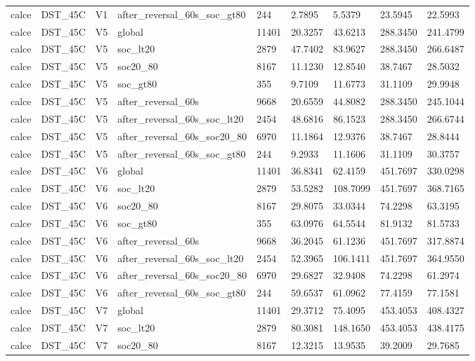 \begin{tabular}{lllllllll}
calce & DST\_45C & V1 & after\_reversal\_60s\_soc\_gt80 & 244 & 2.7895 & 5.5379 & 23.5945 & 22.5993 \\
calce & DST\_45C & V5 & global & 11401 & 20.3257 & 43.6213 & 288.3450 & 241.4799 \\
calce & DST\_45C & V5 & soc\_lt20 & 2879 & 47.7402 & 83.9627 & 288.3450 & 266.6487 \\
calce & DST\_45C & V5 & soc20\_80 & 8167 & 11.1230 & 12.8540 & 38.7467 & 28.5032 \\
calce & DST\_45C & V5 & soc\_gt80 & 355 & 9.7109 & 11.6773 & 31.1109 & 29.9948 \\
calce & DST\_45C & V5 & after\_reversal\_60s & 9668 & 20.6559 & 44.8082 & 288.3450 & 245.1044 \\
calce & DST\_45C & V5 & after\_reversal\_60s\_soc\_lt20 & 2454 & 48.6816 & 86.1523 & 288.3450 & 266.6744 \\
calce & DST\_45C & V5 & after\_reversal\_60s\_soc20\_80 & 6970 & 11.1864 & 12.9376 & 38.7467 & 28.8444 \\
calce & DST\_45C & V5 & after\_reversal\_60s\_soc\_gt80 & 244 & 9.2933 & 11.1606 & 31.1109 & 30.3757 \\
calce & DST\_45C & V6 & global & 11401 & 36.8341 & 62.4159 & 451.7697 & 330.0298 \\
calce & DST\_45C & V6 & soc\_lt20 & 2879 & 53.5282 & 108.7099 & 451.7697 & 368.7165 \\
calce & DST\_45C & V6 & soc20\_80 & 8167 & 29.8075 & 33.0344 & 74.2298 & 63.3195 \\
calce & DST\_45C & V6 & soc\_gt80 & 355 & 63.0976 & 64.5544 & 81.9132 & 81.5733 \\
calce & DST\_45C & V6 & after\_reversal\_60s & 9668 & 36.2045 & 61.1236 & 451.7697 & 317.8874 \\
calce & DST\_45C & V6 & after\_reversal\_60s\_soc\_lt20 & 2454 & 52.3965 & 106.1411 & 451.7697 & 364.9550 \\
calce & DST\_45C & V6 & after\_reversal\_60s\_soc20\_80 & 6970 & 29.6827 & 32.9408 & 74.2298 & 61.2974 \\
calce & DST\_45C & V6 & after\_reversal\_60s\_soc\_gt80 & 244 & 59.6537 & 61.0962 & 77.4159 & 77.1581 \\
calce & DST\_45C & V7 & global & 11401 & 29.3712 & 75.4095 & 453.4053 & 408.4327 \\
calce & DST\_45C & V7 & soc\_lt20 & 2879 & 80.3081 & 148.1650 & 453.4053 & 438.4175 \\
calce & DST\_45C & V7 & soc20\_80 & 8167 & 12.3215 & 13.9535 & 39.2009 & 29.7685 \\

\end{tabular}
